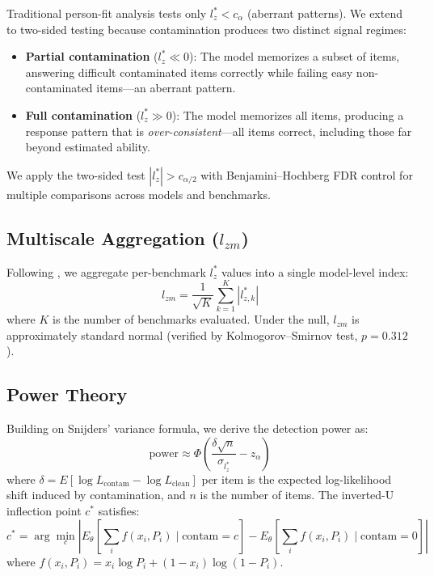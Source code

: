 \documentclass[11pt,a4paper]{article}
\begin{document}
Traditional person-fit analysis tests only $l_z^* < c_{\alpha}$ (aberrant patterns). We extend to two-sided testing because contamination produces two distinct signal regimes:

\begin{itemize}
    \item \textbf{Partial contamination} ($l_z^* \ll 0$): The model memorizes a subset of items, answering difficult contaminated items correctly while failing easy non-contaminated items---an aberrant pattern.
    \item \textbf{Full contamination} ($l_z^* \gg 0$): The model memorizes all items, producing a response pattern that is \emph{over-consistent}---all items correct, including those far beyond estimated ability.
\end{itemize}

We apply the two-sided test $|l_z^*| > c_{\alpha/2}$ with Benjamini--Hochberg FDR control for multiple comparisons across models and benchmarks.

\subsection{Multiscale Aggregation ($l_{zm}$)}

Following \citet{hong2021multiscale}, we aggregate per-benchmark $l_z^*$ values into a single model-level index:
\begin{equation}
l_{zm} = \frac{1}{\sqrt{K}} \sum_{k=1}^{K} |l_{z,k}^*|
\end{equation}
where $K$ is the number of benchmarks evaluated. Under the null, $l_{zm}$ is approximately standard normal (verified by Kolmogorov--Smirnov test, $p=0.312$).

\subsection{Power Theory}

Building on Snijders' variance formula, we derive the detection power as:
\begin{equation}
\text{power} \approx \Phi\!\left(\frac{\delta \sqrt{n}}{\sigma_{l_z^*}} - z_{\alpha}\right)
\label{eq:power}
\end{equation}
where $\delta = E[\log L_{\text{contam}} - \log L_{\text{clean}}]$ per item is the expected log-likelihood shift induced by contamination, and $n$ is the number of items. The inverted-U inflection point $c^*$ satisfies:
\begin{equation}
c^* = \arg\min_{c} \left| E_\theta\!\left[\sum_i f(x_i, P_i) \mid \text{contam}=c\right] - E_\theta\!\left[\sum_i f(x_i, P_i) \mid \text{contam}=0\right] \right|
\end{equation}
where $f(x_i, P_i) = x_i \log P_i + (1-x_i)\log(1-P_i)$.
\end{document}
